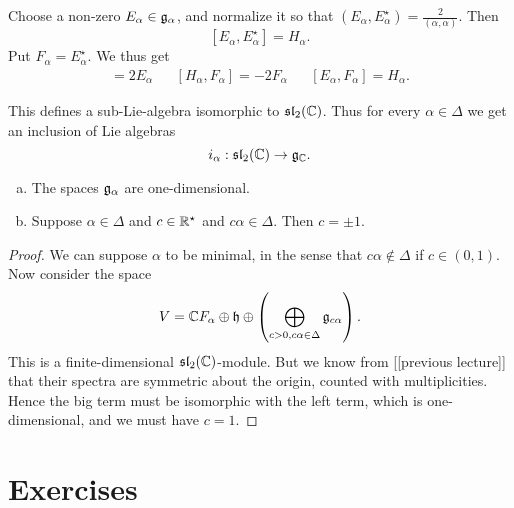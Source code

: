 \documentclass[11pt, english]{article}
\begin{document}
Choose a non-zero $E_\alpha \in \mathfrak g_\alpha$, and normalize it so that $(E_\alpha,E_\alpha^\star) = \frac{2}{(\alpha,\alpha)}$. Then
$$
[E_\alpha,E_\alpha^\star] = H_\alpha.
$$
Put $F_\alpha = E_\alpha^\star$. We thus get
\begin{align*}
  [H_\alpha, E_\alpha] = 2 E_\alpha && [H_\alpha ,F_\alpha] = -2F_\alpha && [E_\alpha, F_\alpha] = H_\alpha.
\end{align*}

This defines a sub-Lie-algebra isomorphic to $\mathfrak{sl}_2(\mathbb{C})$. Thus for every $\alpha \in \Delta$ we get an inclusion of Lie algebras
$$
i_\alpha: \mathfrak{sl}_2(\mathbb{C}) \to \mathfrak g_{\mathbb{C}}.
$$

\begin{lemma}
\begin{enumerate}[a)]
\item The spaces $\mathfrak g_\alpha$ are one-dimensional.
\item Suppose $\alpha \in \Delta$ and $c \in \mathbb{R}^\star$ and $c\alpha \in \Delta$. Then $c = \pm 1$.
\end{enumerate}
\end{lemma}
\begin{proof}
We can suppose $\alpha$ to be minimal, in the sense that $c \alpha \not \in \Delta$ if $c \in (0,1)$. Now consider the space
$$
V = \mathbb{C} F_\alpha \oplus \mathfrak h \oplus \left( \bigoplus_{c > 0, c \alpha \in \Delta} \mathfrak g_{c \alpha} \right).
$$
This is a finite-dimensional $\mathfrak{sl}_2(\mathbb{C})$-module. But we know from [[previous lecture]] that their spectra are symmetric about the origin, counted with multiplicities. Hence the big term must be isomorphic with the left term, which is one-dimensional, and we must have $c=1$.
\end{proof}



\newpage
\appendix
\section{Exercises}
\end{document}
